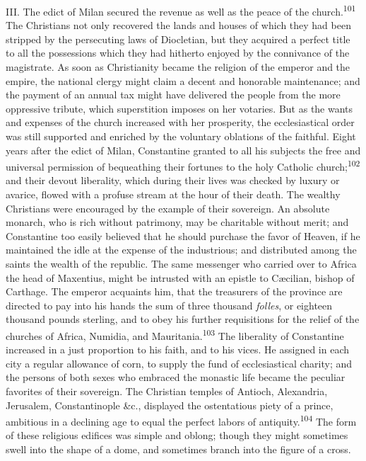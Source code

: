 III. The edict of Milan secured the revenue as well as the peace of the
church.\textsuperscript{101} The Christians not only recovered the lands and houses of
which they had been stripped by the persecuting laws of Diocletian, but
they acquired a perfect title to all the possessions which they had
hitherto enjoyed by the connivance of the magistrate. As soon as
Christianity became the religion of the emperor and the empire, the
national clergy might claim a decent and honorable maintenance; and the
payment of an annual tax might have delivered the people from the more
oppressive tribute, which superstition imposes on her votaries. But as
the wants and expenses of the church increased with her prosperity, the
ecclesiastical order was still supported and enriched by the voluntary
oblations of the faithful. Eight years after the edict of Milan,
Constantine granted to all his subjects the free and universal
permission of bequeathing their fortunes to the holy Catholic church;\textsuperscript{102}
and their devout liberality, which during their lives was checked
by luxury or avarice, flowed with a profuse stream at the hour of their
death. The wealthy Christians were encouraged by the example of their
sovereign. An absolute monarch, who is rich without patrimony, may be
charitable without merit; and Constantine too easily believed that he
should purchase the favor of Heaven, if he maintained the idle at the
expense of the industrious; and distributed among the saints the wealth
of the republic. The same messenger who carried over to Africa the head
of Maxentius, might be intrusted with an epistle to Cæcilian, bishop of
Carthage. The emperor acquaints him, that the treasurers of the
province are directed to pay into his hands the sum of three thousand
\textit{folles}, or eighteen thousand pounds sterling, and to obey his further
requisitions for the relief of the churches of Africa, Numidia, and
Mauritania.\textsuperscript{103} The liberality of Constantine increased in a just
proportion to his faith, and to his vices. He assigned in each city a
regular allowance of corn, to supply the fund of ecclesiastical
charity; and the persons of both sexes who embraced the monastic life
became the peculiar favorites of their sovereign. The Christian temples
of Antioch, Alexandria, Jerusalem, Constantinople \&c., displayed the
ostentatious piety of a prince, ambitious in a declining age to equal
the perfect labors of antiquity.\textsuperscript{104} The form of these religious
edifices was simple and oblong; though they might sometimes swell into
the shape of a dome, and sometimes branch into the figure of a cross.
